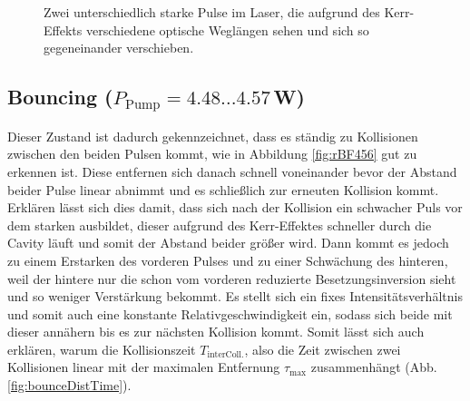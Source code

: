 \documentclass[bachelor,       %
               twoside,        %
               BCOR10mm,       %
               english,ngerman, %
               ]{GAUBM}
\begin{document}
\begin{figure}[!htb]
   \centering   
   \hfill
   \caption{Zwei unterschiedlich starke Pulse im Laser, die aufgrund des Kerr-Effekts verschiedene optische Weglängen sehen und sich so gegeneinander verschieben.}
   \label{fig:running441}
 \end{figure}

\subsection{Bouncing ($P_\text{Pump}=4.48\dots4.57\,$W)}
Dieser Zustand ist dadurch gekennzeichnet, dass es ständig zu Kollisionen zwischen den beiden Pulsen kommt, wie in Abbildung \ref{fig:rBF456} gut zu erkennen ist.
Diese entfernen sich danach schnell voneinander bevor der Abstand beider Pulse linear abnimmt und es schließlich zur erneuten Kollision kommt.
Erklären lässt sich dies damit, dass sich nach der Kollision ein schwacher Puls vor dem starken ausbildet, dieser aufgrund des Kerr-Effektes schneller durch die Cavity läuft und somit der Abstand beider größer wird.
Dann kommt es jedoch zu einem Erstarken des vorderen Pulses und zu einer Schwächung des hinteren, weil der hintere nur die schon vom vorderen reduzierte Besetzungsinversion sieht und so weniger Verstärkung bekommt.
Es stellt sich ein fixes Intensitätsverhältnis und somit auch eine konstante Relativgeschwindigkeit ein, sodass sich beide mit dieser annähern bis es zur nächsten Kollision kommt.
Somit lässt sich auch erklären, warum die Kollisionszeit $T_\text{interColl.}$, also die Zeit zwischen zwei Kollisionen linear mit der maximalen Entfernung $\tau_\text{max}$ zusammenhängt (Abb. \ref{fig:bounceDistTime}).
\end{document}
